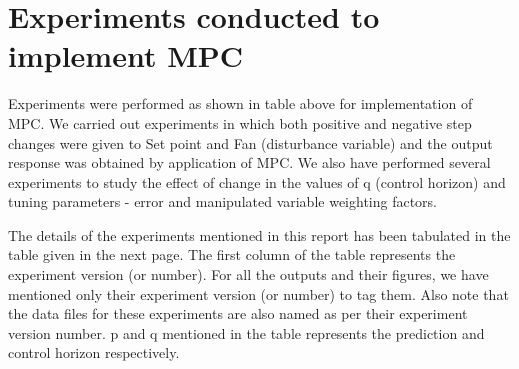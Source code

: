 \section{Experiments conducted to implement MPC}
Experiments were performed as shown in table above for implementation of MPC. We carried out experiments in which both positive and negative step changes were given to Set point and Fan (disturbance variable) and the output response was obtained by application of MPC. We also have performed several experiments to study the effect of change in the values of q (control horizon) and tuning parameters - error and manipulated variable weighting factors. 

The details of the experiments mentioned in this report has been tabulated in the table given in the next page. The first column of the table represents the experiment version (or number). For all the outputs and their figures, we have mentioned only their experiment version (or number) to tag them. Also note that the data files for these experiments are also named as per their experiment version number. p and q mentioned in the table represents the prediction and control horizon respectively. 

